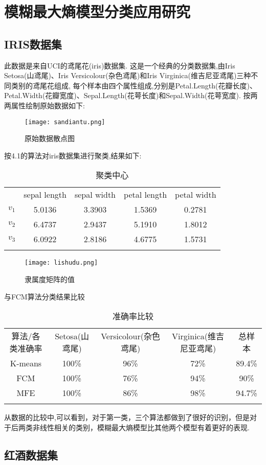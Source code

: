 \chapter{模糊最大熵模型分类应用研究}

\section{IRIS数据集}
\par
此数据是来自UCI的鸢尾花(iris)数据集.
这是一个经典的分类数据集,由Iris Setosa(山鸢尾)、Iris Versicolour(杂色鸢尾)和Iris Virginica(维吉尼亚鸢尾)三种不同类别的鸢尾花组成,
每个样本由四个属性组成,分别是Petal.Length(花瓣长度)、Petal.Width(花瓣宽度)、Sepal.Length(花萼长度)和Sepal.Width(花萼宽度).
按两两属性绘制原始数据如下:
\begin{figure}[!ht]
    \centering
    \texttt{[image: sandiantu.png]}
    \caption{原始数据散点图}
    \label{散点图}
\end{figure}
\par 按4.1的算法对iris数据集进行聚类,结果如下:
\begin{table}[!ht]
    \label{聚类中心}
    \caption{聚类中心}
    \centering
    \begin{tabular}{c c c c c}
        \whline & sepal length & sepal width & petal length & petal width \\\whline
        $v_1$   & 5.0136       & 3.3903      & 1.5369       & 0.2781      \\
        $v_2$   & 6.4737       & 2.9437      & 5.1910       & 1.8012      \\
        $v_3$   & 6.0922       & 2.8186      & 4.6775       & 1.5731      \\
        \whline
    \end{tabular}
\end{table}
\begin{figure}[!ht]
    \centering
    \texttt{[image: lishudu.png]}
    \caption{隶属度矩阵的值}
    \label{隶属度}
\end{figure}
\newpage
与FCM算法分类结果比较
\begin{table}[!ht]
    \label{准确率比较}
    \caption{准确率比较}
    \centering
    \begin{tabular}{c | c c c c}
        \whline 算法/各类准确率 & Setosa(山鸢尾) & Versicolour(杂色鸢尾) & Virginica(维吉尼亚鸢尾) & 总样本 \\\whline
        K-means                & 100\%          & 96\%                  & 72\%                    & 89.4\%   \\
        FCM                    & 100\%          & 76\%                  & 94\%                    & 90\%   \\
        MFE                    & 100\%          & 86\%                  & 98\%                    & 94.7\% \\
        \whline
    \end{tabular}
\end{table}
从数据的比较中,可以看到，对于第一类，三个算法都做到了很好的识别，但是对于后两类非线性相关的类别，模糊最大熵模型比其他两个模型有着更好的表现.
\section{红酒数据集}

